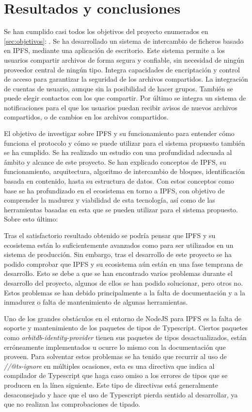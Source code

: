 \chapter{Resultados y conclusiones}\label{chap:6resultados}

Se han cumplido casi todos los objetivos del proyecto enumerados en \ref{sec:objetivos}: . Se ha desarrollado un sistema de intercambio de ficheros basado en IPFS, mediante una aplicación de escritorio. Este sistema permite a los usuarios compartir archivos de forma segura y confiable, sin necesidad de ningún proveedor central de ningún tipo. Integra capacidades de encriptación y control de acceso para garantizar la seguridad de los archivos compartidos. La integración de cuentas de usuario, aunque sin la posibilidad de hacer grupos. También se puede elegir contactos con los que compartir. Por último se integra un sistema de notificaciones para el que
los usuarios puedan recibir avisos de nuevos archivos compartidos, o de cambios en los archivos compartidos.

El objetivo de investigar sobre IPFS y su funcionamiento para entender cómo funciona el protocolo y cómo se puede utilizar para el sistema propuesto también se ha cumplido. Se ha realizado un estudio con una profundidad adecuada al ámbito y alcance de este proyecto. Se han explicado conceptos de IPFS, su funcionamiento, arquitectura, algoritmo de intercambio de bloques, identificación basada en contenido, hasta su estructura de datos.
Con estos conceptos como base se ha profundizado en el ecosistema en torno a IPFS, con objetivo de comprender la madurez y viabilidad de esta tecnología, así como de las herramientas basadas en esta que se pueden utilizar para el sistema propuesto. Sobre esto último:

Tras el satisfactorio resultado obtenido se podría pensar que IPFS y su ecosistema están lo suficientemente avanzados como para ser utilizados en un sistema de producción. Sin embargo, tras el desarrollo de este proyecto se ha podido comprobar que IPFS y su ecosistema aún están en una fase temprana de desarrollo. Esto se debe a que se han encontrado varios problemas durante el desarrollo del proyecto, algunos de ellos se han podido solucionar, pero otros no. Estos problemas se han debido principalmente a la falta de documentación y a la inmadurez o falta de mantenimiento de algunas herramientas.

Uno de los grandes obstáculos en el entorno de NodeJS para IPFS es la falta de soporte y mantenimiento de los paquetes de tipos de Typescript.
Ciertos paquetes como \textit{orbitdb-identity-provider} tienen sus paquetes de tipos desactualizados, están erróneamente implementados u ocurre lo mismo con
la documentación que proveen. Para solventar estos problemas se ha tenido que recurrir al uso de \textit{//@ts-ignore} en múltiples ocasiones, esta
es una directiva que indica al compilador de Typescript que haga caso omiso a los errores de tipos que se producen en la línea siguiente. Este tipo de directivas está
generalmente desaconsejado y hace que el uso de Typescript pierda sentido al desarrollar, ya que no realizan las comprobaciones de tipado.

